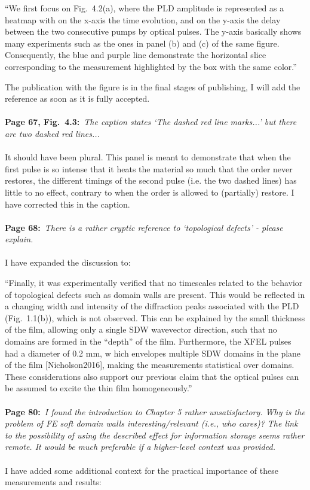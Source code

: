 \documentclass[a4, UTF8]{article}
\begin{document}
``We first focus on Fig.~4.2(a), where the PLD amplitude is represented as a heatmap with on the x-axis the time evolution, and on the y-axis the delay between the two consecutive pumps by optical pulses. The y-axis basically shows many experiments such as the ones in panel (b) and (c) of the same figure. Consequently, the blue and purple line demonstrate the horizontal slice corresponding to the measurement highlighted by the box with the same color.''

The publication with the figure is in the final stages of publishing, I will add the reference as soon as it is fully accepted.
\\\\
{\bf Page 67, Fig.~4.3:}~{\it The caption states `The dashed red line marks...’ but there are two dashed red lines...}
\\\\
It should have been plural. This panel is meant to demonstrate that when the first pulse is so intense that it heats the material so much that the order never restores, the different timings of the second pulse (i.e. the two dashed lines) has little to no effect, contrary to when the order is allowed to (partially) restore.
I have corrected this in the caption.
\\\\
{\bf Page 68:}~{\it There is a rather cryptic reference to `topological defects' - please explain.}
\\\\
I have expanded the discussion to:

``Finally, it was experimentally verified that no timescales related to the behavior of topological defects such as domain walls are present. This would be reflected in a changing width and intensity of the diffraction peaks associated with the \gls{PLD} (Fig.~1.1(b)), which is not observed. This can be explained by the small thickness of the film, allowing only a single \gls{SDW} wavevector direction, such that no domains are formed in the ``depth'' of the film. Furthermore, the XFEL pulses had a diameter of 0.2 mm, w hich envelopes multiple \gls{SDW} domains in the plane of the film [Nicholson2016], making the measurements statistical over domains.
These considerations also support our previous claim that the optical pulses can be assumed to excite the thin film homogeneously.''
\\\\
{\bf Page 80:}~{\it I found the introduction to Chapter 5 rather unsatisfactory. Why is the problem of FE soft domain walls interesting/relevant (i.e., who cares)? The link to the possibility of using the described effect for information storage seems rather remote. It would be much preferable if a
higher-level context was provided.}
\\\\
I have added some additional context for the practical importance of these measurements and results:
\end{document}
